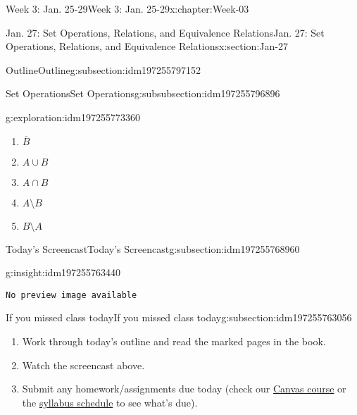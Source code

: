\documentclass[oneside,10pt,]{book}
\newcommand{\mono}[1]{\texttt{#1}}
\numberwithin{equation}{section}
\newlength{\qrsize}
\newlength{\previewwidth}
\renewcommand{\bar}{\overline}
\begin{document}
\begin{chapterptx}{Week 3: Jan. 25-29}{}{Week 3: Jan. 25-29}{}{}{x:chapter:Week-03}
\begin{sectionptx}{Jan. 27: Set Operations, Relations, and Equivalence Relations}{}{Jan. 27: Set Operations, Relations, and Equivalence Relations}{}{}{x:section:Jan-27}
\begin{subsectionptx}{Outline}{}{Outline}{}{}{g:subsection:idm197255797152}
\begin{subsubsectionptx}{Set Operations}{}{Set Operations}{}{}{g:subsubsection:idm197255796896}
\begin{exploration}{}{g:exploration:idm197255773360}
\begin{enumerate}
\item{}\(\displaystyle {\bar B}\)%
\item{}\(\displaystyle A\cup B\)%
\item{}\(\displaystyle A\cap B\)%
\item{}\(\displaystyle A\setminus B\)%
\item{}\(\displaystyle B\setminus A\)%
\end{enumerate}
\end{exploration}%
\end{subsubsectionptx}
\end{subsectionptx}
%
%
\typeout{************************************************}
\typeout{************************************************}
%
\begin{subsectionptx}{Today's Screencast}{}{Today's Screencast}{}{}{g:subsection:idm197255768960}
\begin{insight}{}{g:insight:idm197255763440}%
\setlength{\qrsize}{9em}
\setlength{\previewwidth}{\linewidth}
\addtolength{\previewwidth}{-\qrsize}
\begin{tcbraster}[raster columns=2, raster column skip=1pt, raster halign=center, raster force size=false, raster left skip=0pt, raster right skip=0pt]%
\begin{tcolorbox}[previewstyle, width=\previewwidth]%
\mono{No preview image available}%
\end{tcolorbox}%
\begin{tcolorbox}[qrstyle]%
[QR LINK]\end{tcolorbox}%
\end{tcbraster}%
\end{insight}
\end{subsectionptx}
%
%
\typeout{************************************************}
\typeout{************************************************}
%
\begin{subsectionptx}{If you missed class today}{}{If you missed class today}{}{}{g:subsection:idm197255763056}
%
\begin{enumerate}
\item{}Work through today's outline and read the marked pages in the book.%
\item{}Watch the screencast above.%
\item{}Submit any homework\slash{}assignments due today (check our \href{https://dordt.instructure.com/courses/3110050}{Canvas course} or the \href{https://prof.mkjanssen.org/ds/index.html\#schedule}{syllabus schedule} to see what's due).%

\end{enumerate}
\end{subsectionptx}
\end{sectionptx}
\end{chapterptx}
\end{document}

